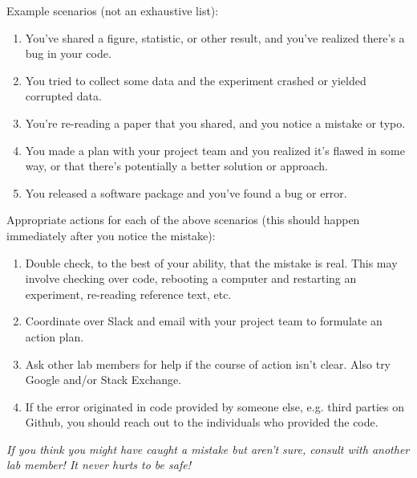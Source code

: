 \documentclass{tufte-book} %
\begin{document}
\noindent Example scenarios (not an exhaustive list):
\begin{enumerate}
 \item You've shared a figure, statistic, or other result, and  you've realized there's a bug in your code.
 \item You tried to collect some data and the experiment crashed or  yielded corrupted data.
 \item You're re-reading a paper that you shared, and you notice a mistake or typo.
 \item You made a plan with your project team and you realized it's flawed in some way, or that there's potentially a better solution or approach.
 \item You released a software package and you've found a bug or error.
\end{enumerate}

\noindent Appropriate actions for each of the above scenarios (this should happen immediately after you notice the mistake):
\begin{enumerate}
\item Double check, to the best of your ability, that the mistake is real. This may involve checking over code, rebooting a computer and restarting an experiment, re-reading reference text, etc.
 \item Coordinate over Slack and email with your project team to formulate an action plan.
\item Ask other lab members for help if the course of action isn't clear. Also try Google and/or Stack Exchange.
 \item If the error originated in code provided by someone else, e.g. third parties on Github, you should reach out to the individuals who provided the code.
\end{enumerate}

\noindent \textit{If you think you might have caught a mistake but aren't
 sure, consult with another lab member! It never hurts to be safe!}



\end{document}
